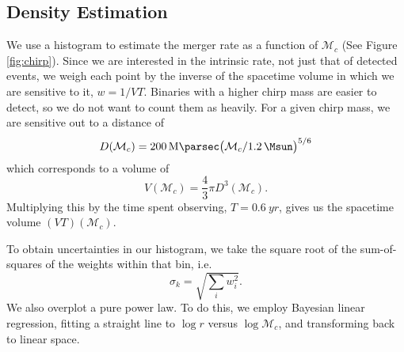 \subsection{Density Estimation}

We use a histogram to estimate the merger rate as a function of $\mathcal{M}_c$ (See Figure \ref{fig:chirp}). Since we are interested in the intrinsic rate, not just that of detected events, we weigh each point by the inverse of the spacetime volume in which we are sensitive to it, $w = 1 / VT$. Binaries with a higher chirp mass are easier to detect, so we do not want to count them as heavily. For a given chirp mass, we are sensitive out to a distance of
%
\begin{equation}
  D(\mathcal{M}_c) =
  \SI{200}{\mega\parsec} \qty( \mathcal{M}_c / \SI{1.2}{\Msun} )^{5/6}
\end{equation}
%
which corresponds to a volume of
%
\begin{equation}
  V(\mathcal{M}_c) = \frac{4}{3} \pi D^3(\mathcal{M}_c).
\end{equation}
%
Multiplying this by the time spent observing, $T = \SI{0.6}{yr}$, gives us the spacetime volume $(VT)(\mathcal{M}_c)$.

To obtain uncertainties in our histogram, we take the square root of the sum-of-squares of the weights within that bin, i.e.
%
\begin{equation}
  \sigma_k = \sqrt{\sum_i w_i^2}.
\end{equation}
%
We also overplot a pure power law. To do this, we employ Bayesian linear regression, fitting a straight line to $\log r$ versus $\log \mathcal{M}_c$, and transforming back to linear space.